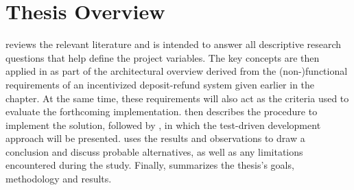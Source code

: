 \section{Thesis Overview}
 reviews the relevant literature and is intended to answer all descriptive research questions that help define the project variables. The key concepts are then applied in  as part of the architectural overview derived from the (non-)functional requirements of an incentivized deposit-refund system given earlier in the chapter. At the same time, these requirements will also act as the criteria used to evaluate the forthcoming implementation.  then describes the procedure to implement the solution, followed by , in which the test-driven development approach will be presented.  uses the results and observations to draw a conclusion and discuss probable alternatives, as well as any limitations encountered during the study. Finally,  summarizes the thesis's goals, methodology and results. 

